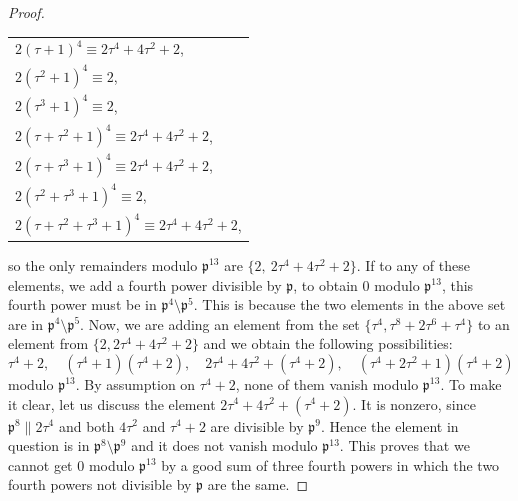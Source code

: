 \documentclass[12pt]{article}
\theoremstyle{remark}
\begin{document}
\begin{proof}
\begin{center}
\begin{tabular}{@{}l@{}}
    $2(\tau+1)^4 \equiv 2\tau^4+4\tau^2+2$,\\
    $2(\tau^2+1)^4 \equiv 2$,\\
    $2(\tau^3+1)^4 \equiv 2$,\\
    $2(\tau+\tau^2+1)^4 \equiv 2\tau^4+4\tau^2+2$,\\
    $2(\tau+\tau^3+1)^4 \equiv 2\tau^4+4\tau^2+2$,\\
    $2(\tau^2+\tau^3+1)^4 \equiv 2$,\\
    $2(\tau+\tau^2+\tau^3+1)^4 \equiv 2\tau^4 + 4\tau^2 + 2 $,
\end{tabular}
\end{center}
so the only remainders modulo $\mathfrak{p}^{13}$ are $\{ 2, \ 2\tau^4+4\tau^2+2 \}$. If to any of these elements, we add a fourth power divisible by $\mathfrak{p}$, to obtain 0 modulo $\mathfrak{p}^{13}$,
this fourth power must be in $\mathfrak{p}^4\setminus \mathfrak{p}^5$. This is because the two elements in the above set are in $\mathfrak{p}^4\setminus \mathfrak{p}^5$. Now, we are adding an element from the set $\{\tau^4,\tau^8+2\tau^6+\tau^4\}$ to an element from $\{ 2,2\tau^4+4\tau^2+2 \}$ and we obtain the following possibilities: 
\[\tau^4+2,\quad (\tau^4+1)(\tau^4+2),\quad  2\tau^4 + 4\tau^2 + (\tau^4+2),\quad  (\tau^4+2\tau^2+1)(\tau^4+2)\] 
modulo $\mathfrak{p}^{13}$. By assumption on $\tau^4+2$, none of them vanish modulo $\mathfrak{p}^{13}$. To make it clear, let us discuss the element $2\tau^4 + 4\tau^2 + (\tau^4+2)$. It is nonzero, since $\mathfrak{p}^8 \parallel 2\tau^4$ and both $4\tau^2$ and $\tau^4+2$ are divisible by $\mathfrak{p}^9$. Hence the element in question is in $\mathfrak{p}^8\setminus \mathfrak{p}^9$ and it does not vanish modulo $\mathfrak{p}^{13}$. This proves that we cannot get 0 modulo $\mathfrak{p}^{13}$ by a good sum of three fourth powers in which the two fourth powers not divisible by $\mathfrak{p}$ are the same. 


\end{proof}
\end{document}
